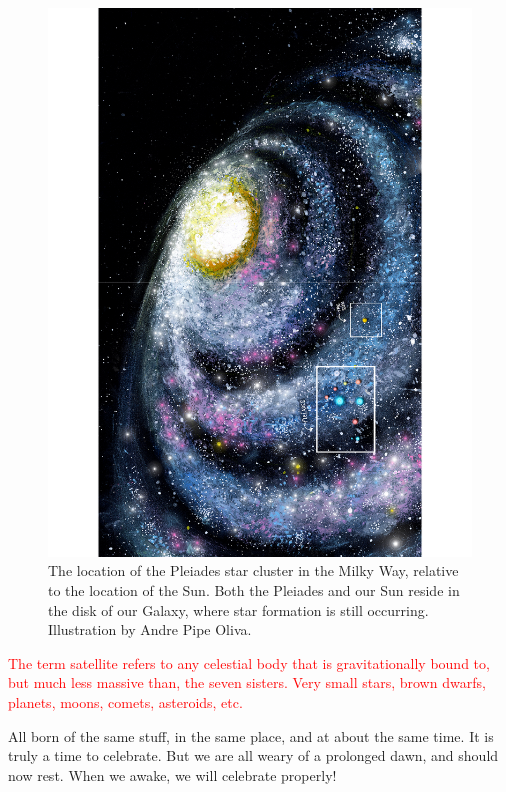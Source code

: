 \documentclass[main.tex]{subfiles}
\begin{document}
\begin{figure}
\includegraphics[width=\columnwidth,angle=270,origin=c]{ch1_5.pdf}
\caption{The location of the Pleiades star cluster in the Milky Way, relative to the location of the Sun.  Both the Pleiades and our Sun reside in the disk of our Galaxy, where star formation is still occurring.  Illustration by Andre Pipe Oliva.
\label{fig:fig5}}
\end{figure}


\begin{tcolorbox}[sharp corners, colback=red!30, colframe=red!80!blue, title=Satellites]
\par \textcolor{red} {The term satellite refers to any celestial body that is gravitationally bound to, but much less massive than, the seven sisters.  Very small stars, brown dwarfs, planets, moons, comets, asteroids, etc.} 
\end{tcolorbox} 

\par \Maia All born of the same stuff, in the same place, and at about the same time.  It is truly a time to celebrate.  But we are all weary of a prolonged dawn, and should now rest.  When we awake, we will celebrate properly!
\end{document}
